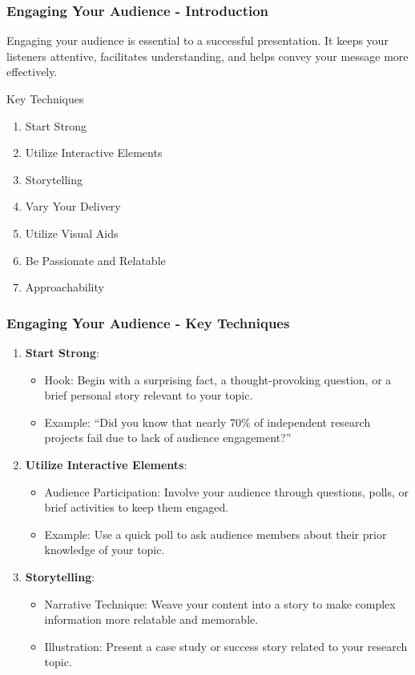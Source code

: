 \documentclass[aspectratio=169]{beamer}
\begin{document}
\begin{frame}[fragile]
  \frametitle{Engaging Your Audience - Introduction}
  Engaging your audience is essential to a successful presentation. It keeps your listeners attentive, facilitates understanding, and helps convey your message more effectively.
  \begin{block}{Key Techniques}
    \begin{enumerate}
      \item Start Strong
      \item Utilize Interactive Elements
      \item Storytelling
      \item Vary Your Delivery
      \item Utilize Visual Aids
      \item Be Passionate and Relatable
      \item Approachability
    \end{enumerate}
  \end{block}
\end{frame}

\begin{frame}[fragile]
  \frametitle{Engaging Your Audience - Key Techniques}
  \begin{enumerate}
    \item \textbf{Start Strong}:
    \begin{itemize}
      \item Hook: Begin with a surprising fact, a thought-provoking question, or a brief personal story relevant to your topic.
      \item Example: “Did you know that nearly 70\% of independent research projects fail due to lack of audience engagement?”
    \end{itemize}
    
    \item \textbf{Utilize Interactive Elements}:
    \begin{itemize}
      \item Audience Participation: Involve your audience through questions, polls, or brief activities to keep them engaged.
      \item Example: Use a quick poll to ask audience members about their prior knowledge of your topic.
    \end{itemize}

    \item \textbf{Storytelling}:
    \begin{itemize}
      \item Narrative Technique: Weave your content into a story to make complex information more relatable and memorable.
      \item Illustration: Present a case study or success story related to your research topic.
    \end{itemize}
  \end{enumerate}
\end{frame}
\end{document}
